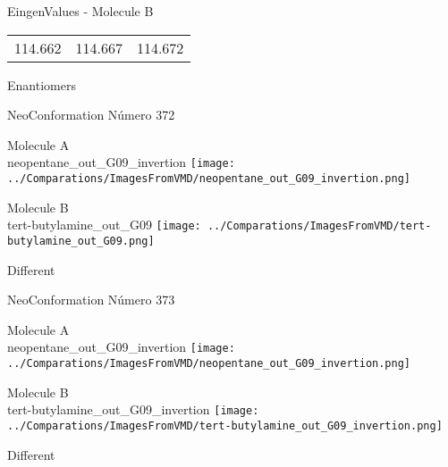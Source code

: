 \begin{multicols}{2}
\begin{center}
\vtab
 EingenValues - Molecule B     \\
\vtab
\begin{tabular}{|c c c|}
114.662	 & 	114.667	 & 	114.672	 \\
\end{tabular}

\end{center}
\end{multicols}
\begin{center}
\vtab
\vtab
\textcolor{NavyBlue}{\Large Enantiomers}
\end{center}

 \newpage

\vtab[-2cm]
\begin{center}
{\large NeoConformation \tab Número 372}
\end{center}
\begin{multicols}{2}
\begin{center}
Molecule A \\ 
neopentane\_out\_G09\_invertion
\texttt{[image: ../Comparations/ImagesFromVMD/neopentane\_out\_G09\_invertion.png]}
\\
\vtab

\columnbreak
Molecule B \\ 
tert-butylamine\_out\_G09
\texttt{[image: ../Comparations/ImagesFromVMD/tert-butylamine\_out\_G09.png]}
\\
\vtab


\end{center}
\end{multicols}
\begin{center}
\vtab
\vtab
\textcolor{NavyBlue}{\Large Different}
\end{center}

 \newpage

\vtab[-2cm]
\begin{center}
{\large NeoConformation \tab Número 373}
\end{center}
\begin{multicols}{2}
\begin{center}
Molecule A \\ 
neopentane\_out\_G09\_invertion
\texttt{[image: ../Comparations/ImagesFromVMD/neopentane\_out\_G09\_invertion.png]}
\\
\vtab

\columnbreak
Molecule B \\ 
tert-butylamine\_out\_G09\_invertion
\texttt{[image: ../Comparations/ImagesFromVMD/tert-butylamine\_out\_G09\_invertion.png]}
\\
\vtab


\end{center}
\end{multicols}
\begin{center}
\vtab
\vtab
\textcolor{NavyBlue}{\Large Different}
\end{center}

